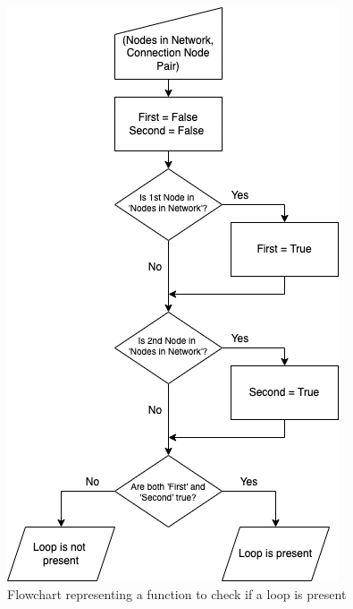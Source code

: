 \documentclass[twocolumn]{article}
\begin{document}
\begin{figure}[H]
\centering
\includegraphics[width=0.70\columnwidth]{Figures/Flowchart 2.png}
\caption{Flowchart representing a function to check if a loop is present}
\label{fig:flow2}
\end{figure}
\end{document}
